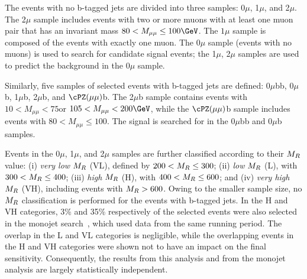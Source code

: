 The events with no b-tagged jets are divided into three samples: 0$\mu$,
1$\mu$, and 2$\mu$. The 2$\mu$ sample includes events with two or more
muons with at least one muon pair that has an invariant
mass $80 < M_{\mu\mu} \le 100\GeV$. The $1\mu$ sample is
composed of the events with exactly one muon. The $0\mu$ sample
(events with no muons) is used
to search for candidate signal events; the 1$\mu$, 2$\mu$ samples are used to predict
the background in the 0$\mu$ sample.

Similarly, five samples of selected events with b-tagged jets are
defined: 0$\mu$bb, 0$\mu$b, 1$\mu$b, 2$\mu$b, and
$\cPZ(\mu\mu)$b. The 2$\mu$b sample contains events with $10<
M_{\mu\mu} <75$\GeV or $105< M_{\mu\mu} <200\GeV$,
while the $\cPZ(\mu\mu)$b sample includes events with $80<
M_{\mu\mu} \leq 100$\GeV. The signal is searched for in the
0$\mu$bb and 0$\mu$b samples.

Events in the 0$\mu$, 1$\mu$, and 2$\mu$ samples are further
classified according to their $M_R$ value: (i) \textit{very low} $M_R$ (VL), defined by $200<M_R
\leq 300$\GeV; (ii) \textit{low} $M_R$ (L), with $300
<M_R \leq 400$\GeV; (iii) \textit{high} $M_R$ (H),
with $400 <M_R\leq 600$\GeV; and (iv) \textit{very high}
$M_R$ (VH), including events with $M_R>600$\GeV. Owing to the smaller sample size, no
$M_R$ classification is performed for the events with b-tagged
jets.
In the H and VH categories, 3\% and 35\% respectively of the selected
events were also selected in the monojet search~\cite{monojet8TeV}, which used data from the same running period.
The overlap
in the L and VL categories is negligible, while the overlapping events in the H and VH categories were shown not to have an impact on the final sensitivity. Consequently, the results
from this analysis and from the monojet analysis are largely statistically independent.

